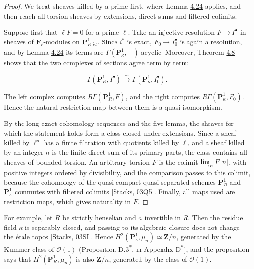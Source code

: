 \documentclass[11pt]{article}
\newcommand{\bpout}[1]{#1\textsuperscript{\hyperlink{bp-outside}{\ensuremath{\ast}}}}
\begin{document}
\begin{proof}[{Proof}]\label{bp356}%
We treat sheaves killed by a prime first, where Lemma \hyperref[bp352]{4.24} applies, and then reach all torsion sheaves by extensions, direct sums and filtered colimits.

Suppose first that \(\ell F=0\) for a prime \(\ell\).  Take an injective resolution \(F\to I^\bullet\) in sheaves of \(\mathbf F_\ell\)-modules on \(\mathbf P^1_{R,\acute{e}t}\). Since \(i^*\) is exact, \(F_0\to I_0^\bullet\) is again a resolution, and by Lemma \hyperref[bp352]{4.24} its terms are \(\Gamma(\mathbf P^1_\kappa,-)\)-acyclic. Moreover, Theorem \hyperref[bp308]{4.8} shows that the two complexes of sections agree term by term:

\[
\Gamma(\mathbf P^1_R,I^\bullet)\xrightarrow{\sim}
\Gamma(\mathbf P^1_\kappa,I_0^\bullet).
\]

The left complex computes \(R\Gamma(\mathbf P^1_R,F)\), and the right computes \(R\Gamma(\mathbf P^1_\kappa,F_0)\). Hence the natural restriction map between them is a quasi-isomorphism.

By the long exact cohomology sequences and the five lemma, the sheaves for which the statement holds form a class closed under extensions. Since a sheaf killed by \(\ell^a\) has a finite filtration with quotients killed by \(\ell\), and a sheaf killed by an integer \(n\) is the finite direct sum of its primary parts, the class contains all sheaves of bounded torsion. An arbitrary torsion \(F\) is the colimit \(\varinjlim_n F[n]\), with positive integers ordered by divisibility, and the comparison passes to this colimit, because the cohomology of the quasi-compact quasi-separated schemes \(\mathbf P^1_R\) and \(\mathbf P^1_\kappa\) commutes with filtered colimits [Stacks, \href{https://stacks.math.columbia.edu/tag/03Q5}{03Q5}]. Finally, all maps used are restriction maps, which gives naturality in \(F\).
\end{proof}

\label{bp357}%
For example, let \(R\) be strictly henselian and \(n\) invertible in \(R\). Then the residue field \(\kappa\) is separably closed, and passing to its algebraic closure does not change the étale topos [Stacks, \href{https://stacks.math.columbia.edu/tag/03SI}{03SI}]. Hence \(H^2(\mathbf P^1_\kappa,\mu_n)\simeq\mathbf Z/n\), generated by the Kummer class of \(\mathcal O(1)\) (Proposition \bpout{D.3}, in Appendix \bpout{D}), and the proposition says that \(H^2(\mathbf P^1_R,\mu_n)\) is also \(\mathbf Z/n\), generated by the class of \(\mathcal O(1)\).
\end{document}
